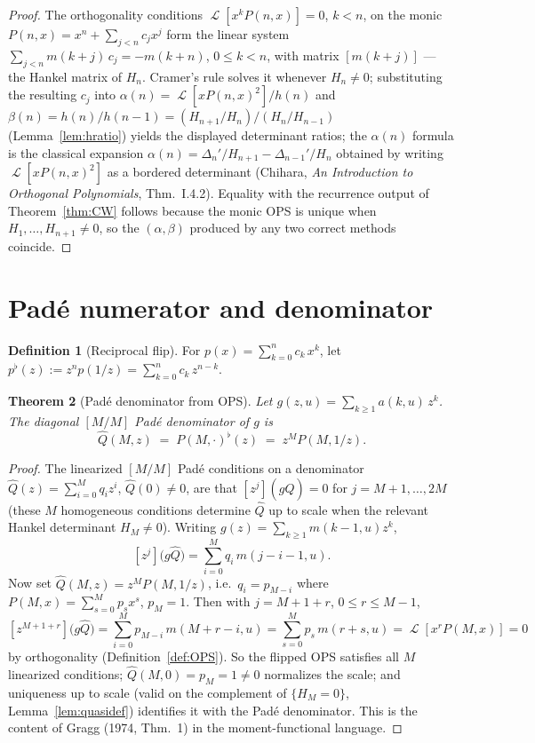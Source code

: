 \documentclass[11pt]{article}
\newtheorem{theorem}{Theorem}[section]
\theoremstyle{definition}
\newtheorem{definition}[theorem]{Definition}
\DeclareMathOperator{\Lop}{\mathcal{L}}
\begin{document}
\begin{proof}
The orthogonality conditions $\Lop[x^{k}P(n,x)] = 0$, $k<n$, on the
monic $P(n,x) = x^{n} + \sum_{j<n} c_{j}x^{j}$ form the linear system
$\sum_{j<n} m(k+j)\,c_{j} = -m(k+n)$, $0 \leq k < n$, with matrix
$[m(k+j)]$ --- the Hankel matrix of $H_{n}$. Cramer's rule solves it
whenever $H_{n}\neq 0$; substituting the resulting $c_{j}$ into
$\alpha(n) = \Lop[xP(n,x)^{2}]/h(n)$ and
$\beta(n) = h(n)/h(n-1) = (H_{n+1}/H_{n})/(H_{n}/H_{n-1})$
(Lemma~\ref{lem:hratio}) yields the displayed determinant ratios; the
$\alpha(n)$ formula is the classical expansion
$\alpha(n) = \Delta_{n}'/H_{n+1} - \Delta_{n-1}'/H_{n}$ obtained by
writing $\Lop[xP(n,x)^{2}]$ as a bordered determinant (Chihara,
\emph{An Introduction to Orthogonal Polynomials}, Thm.~I.4.2).
Equality with the recurrence output of Theorem~\ref{thm:CW} follows
because the monic OPS is unique when $H_{1},\ldots,H_{n+1} \neq 0$,
so the $(\alpha,\beta)$ produced by any two correct methods coincide.
\end{proof}

\section{Pad\'e numerator and denominator}

\begin{definition}[Reciprocal flip]\label{def:flip}
For $p(x) = \sum_{k=0}^{n} c_{k}\, x^{k}$, let
$p^{\flat}(z) := z^{n} p(1/z) = \sum_{k=0}^{n} c_{k}\, z^{n-k}$.
\end{definition}

\begin{theorem}[Pad\'e denominator from OPS]\label{thm:padedenom}
Let $g(z,u) = \sum_{k\geq 1} a(k,u)\, z^{k}$. The diagonal $[M/M]$
Pad\'e denominator of $g$ is
\[
\hat Q(M,z) \;=\; P(M,\cdot)^{\flat}(z) \;=\; z^{M} P(M, 1/z).
\]
\end{theorem}

\begin{proof}
The linearized $[M/M]$ Pad\'e conditions on a denominator
$\hat Q(z) = \sum_{i=0}^{M} q_{i} z^{i}$, $\hat Q(0) \neq 0$, are that
$[z^{j}](g\hat Q) = 0$ for $j = M+1,\ldots,2M$ (these $M$ homogeneous
conditions determine $\hat Q$ up to scale when the relevant Hankel
determinant $H_{M} \neq 0$). Writing
$g(z) = \sum_{k\geq 1} m(k-1,u) z^{k}$,
\[
[z^{j}]\bigl(g\hat Q\bigr)
= \sum_{i=0}^{M} q_{i}\, m(j-i-1,u).
\]
Now set $\hat Q(M,z) = z^{M}P(M,1/z)$, i.e.\ $q_{i} = p_{M-i}$ where
$P(M,x) = \sum_{s=0}^{M} p_{s} x^{s}$, $p_{M}=1$. Then with
$j = M+1+r$, $0 \leq r \leq M-1$,
\[
[z^{M+1+r}]\bigl(g\hat Q\bigr)
= \sum_{i=0}^{M} p_{M-i}\, m(M+r-i,u)
= \sum_{s=0}^{M} p_{s}\, m(r+s,u)
= \Lop[x^{r} P(M,x)] = 0
\]
by orthogonality (Definition~\ref{def:OPS}). So the flipped OPS
satisfies all $M$ linearized conditions; $\hat Q(M,0) = p_{M} = 1
\neq 0$ normalizes the scale; and uniqueness up to scale (valid on
the complement of $\{H_{M} = 0\}$, Lemma~\ref{lem:quasidef})
identifies it with the Pad\'e denominator. This is the content of
Gragg (1974, Thm.~1) in the moment-functional language.
\end{proof}
\end{document}
